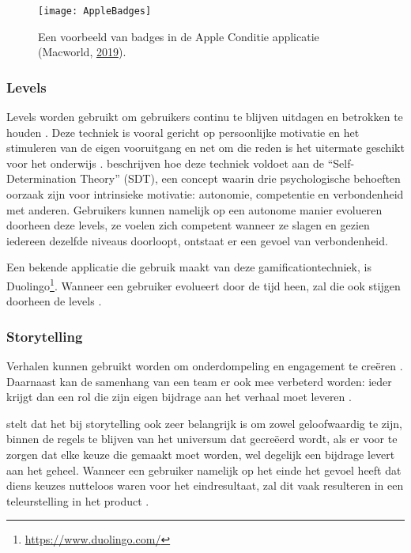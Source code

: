 \begin{figure}[h]
    \caption[Badges in de Apple Conditie applicatie]{Een voorbeeld van badges in de Apple Conditie applicatie (Macworld, \href{https://www.macworld.com/article/231140/how-to-get-all-of-the-apple-watch-activity-challenge-badges.html}{2019}).}
    \texttt{[image: AppleBadges]}
    \label{fig:apple_badges}
\end{figure}

\subsubsection{Levels}
\label{sssec:levels}
Levels worden gebruikt om gebruikers continu te blijven uitdagen en betrokken te houden \autocite{Dong2012}. Deze techniek is vooral gericht op persoonlijke motivatie en het stimuleren van de eigen vooruitgang en net om die reden is het uitermate geschikt voor het onderwijs \autocite{ManzanoLeon2021}.
\textcite{ManzanoLeon2021} beschrijven hoe deze techniek voldoet aan de ``Self-Determination Theory'' (SDT), een concept waarin drie psychologische behoeften oorzaak zijn voor intrinsieke motivatie: autonomie, competentie en verbondenheid met anderen. Gebruikers kunnen namelijk op een autonome manier evolueren doorheen deze levels, ze voelen zich competent wanneer ze slagen en gezien iedereen dezelfde niveaus doorloopt, ontstaat er een gevoel van verbondenheid.

Een bekende applicatie die gebruik maakt van deze gamificationtechniek, is Duolingo\footnote{\href{https://www.duolingo.com/}{https://www.duolingo.com/}}. Wanneer een gebruiker evolueert door de tijd heen, zal die ook stijgen doorheen de levels \autocite{Shortt2021}.

\subsubsection{Storytelling}
Verhalen kunnen gebruikt worden om onderdompeling en engagement te creëren \autocite{ManzanoLeon2021}. Daarnaast kan de samenhang van een team er ook mee verbeterd worden: ieder krijgt dan een rol die zijn eigen bijdrage aan het verhaal moet leveren \autocite{ManzanoLeon2021}.

\textcite{Marczewski2015} stelt dat het bij storytelling ook zeer belangrijk is om zowel geloofwaardig te zijn, binnen de regels te blijven van het universum dat gecreëerd wordt, als er voor te zorgen dat elke keuze die gemaakt moet worden, wel degelijk een bijdrage levert aan het geheel. Wanneer een gebruiker namelijk op het einde het gevoel heeft dat diens keuzes nutteloos waren voor het eindresultaat, zal dit vaak resulteren in een teleurstelling in het product \autocite{Marczewski2015}.


